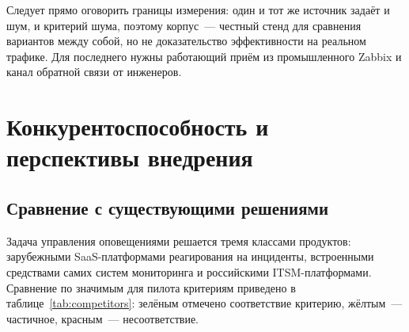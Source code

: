 \documentclass[utf8x, 12pt]{G7-32} %
\begin{document}
Следует прямо оговорить границы измерения: один и тот же источник задаёт и шум,
и критерий шума, поэтому корпус~--- честный стенд для сравнения вариантов между
собой, но не доказательство эффективности на реальном трафике. Для последнего
нужны работающий приём из промышленного Zabbix и канал обратной связи от
инженеров.


\chapter{Конкурентоспособность и перспективы внедрения}

\section{Сравнение с существующими решениями}
Задача управления оповещениями решается тремя классами продуктов:
зарубежными SaaS-платформами реагирования на инциденты, встроенными средствами
самих систем мониторинга и российскими ITSM-платформами.
Сравнение по значимым для пилота критериям приведено в
таблице~\ref{tab:competitors}: \colorbox{cdone}{зелёным} отмечено соответствие
критерию, \colorbox{cpart}{жёлтым}~--- частичное, \colorbox{crisk}{красным}~---
несоответствие.

\begin{table}[H]
\centering
\caption{Сравнение классов решений}
\label{tab:competitors}
\end{table}
\end{document}
